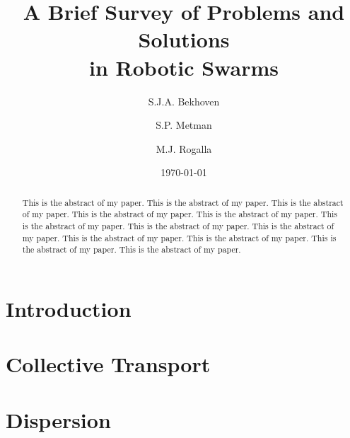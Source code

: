\documentclass[a4paper]{article}
\title{A Brief Survey of Problems and Solutions \\ in Robotic Swarms}
\author{S.J.A. Bekhoven  \and
    S.P. Metman \and
    M.J. Rogalla}
\date{\today}
\begin{document}
\maketitle
\thispagestyle{empty}

\begin{abstract}
This is the abstract of my paper.
This is the abstract of my paper.
This is the abstract of my paper.
This is the abstract of my paper.
This is the abstract of my paper.
This is the abstract of my paper.
This is the abstract of my paper.
This is the abstract of my paper.
This is the abstract of my paper.
This is the abstract of my paper.
This is the abstract of my paper.
This is the abstract of my paper.
\end{abstract}


\section{Introduction}
  
  \begin{center}
  \def\rb{(0:2.5cm) circle (2.5cm)}
  \def\lb{(90:2.5cm) circle (2.5cm)}
  \def\rf{(180:2.5cm) circle (2.5cm)}
  \def\lf{(270:2.5cm) circle (2.5cm)}
  \end{center}
  

\section{Collective Transport}
  
  
\section{Dispersion}
  
 
\end{document}
